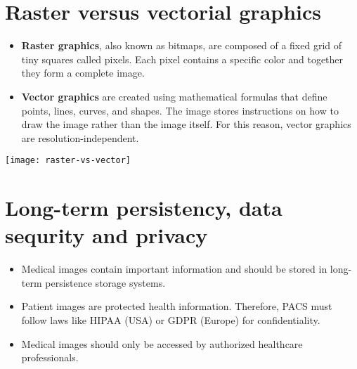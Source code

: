 \section{Raster versus vectorial graphics}
\begin{itemize}
\item \textbf{Raster graphics}, also known as bitmaps, are composed of
  a fixed grid of tiny squares called pixels. Each pixel contains a
  specific color and together they form a complete image.
\item \textbf{Vector graphics} are created using mathematical formulas
  that define points, lines, curves, and shapes. The image stores
  instructions on how to draw the image rather than the image itself.
  For this reason, vector graphics are resolution-independent.
\end{itemize}
\vspace{-2.8ex}
\begin{center}
  \texttt{[image: raster-vs-vector]}
\end{center}

\section{Long-term persistency, data sequrity and privacy}
\begin{itemize}
\item Medical images contain important information and should be
  stored in long-term persistence storage systems.
\item Patient images are protected health information. Therefore,
  \gls{PACS} must follow laws like HIPAA (USA) or GDPR (Europe) for
  confidentiality.
\item Medical images should only be accessed by authorized healthcare
  professionals.
\end{itemize}
